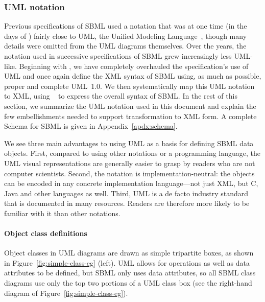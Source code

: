 \begin{blockChanged}

\subsubsection{UML notation}
\label{sec:notation-uml}


Previous specifications of SBML used a notation that was at one
time (in the days of \sbmlone) fairly close to UML, the Unified
Modeling Language~\citep{eriksson:1998,oestereich:1999}, though
many details were omitted from the UML diagrams themselves.  Over
the years, the notation used in successive specifications of SBML
grew increasingly less UML-like.  Beginning with \sbmltwothree, we
have completely overhauled the specification's use of UML and once
again define the XML syntax of SBML using, as much as possible, proper
and complete UML~1.0.  We then systematically map this UML
notation to XML, using \xmlschemaone~\citep{biron:2000,fallside:2000,thompson:2000} to express
the overall syntax of SBML.  In the rest of this section, we
summarize the UML notation used in this document and explain the
few embellishments needed to support transformation to XML form.
A complete Schema for SBML is given in Appendix~\ref{apdx:schema}.

We see three main advantages to using UML as a basis for defining
SBML data objects.  First, compared to using other notations or
a programming language, the UML visual representations are
generally easier to grasp by readers who are not computer
scientists.  Second, the notation is implementation-neutral: the
objects can be encoded in any concrete implementation
language---not just XML, but C, Java and other languages as well.
Third, UML is a de facto industry standard that is documented in
many resources.  Readers are therefore more likely to be familiar
with it than other notations.


\paragraph{Object class definitions}

Object classes in UML diagrams are drawn as simple tripartite
boxes, as shown in Figure~\ref{fig:simple-class-eg} (left).  UML
allows for operations as well as data attributes to be defined,
but SBML only uses data attributes, so all SBML class diagrams use
only the top two portions of a UML class box (see the right-hand
diagram of Figure~\ref{fig:simple-class-eg}).


\end{blockChanged}
